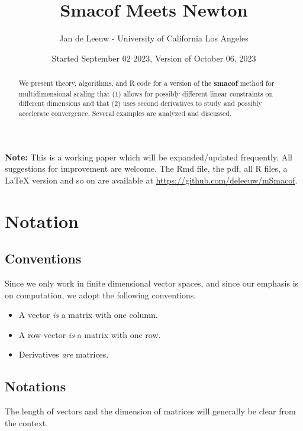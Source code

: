 \documentclass[
  12pt,
]{article}
\title{Smacof Meets Newton}
\author{Jan de Leeuw - University of California Los Angeles}
\date{Started September 02 2023, Version of October 06, 2023}
\providecommand{\tightlist}{%
  \setlength{\itemsep}{0pt}\setlength{\parskip}{0pt}}
\begin{document}
\maketitle
\begin{abstract}
We present theory, algorithms, and R code for a version of the \textbf{smacof} method for multidimensional scaling that (1) allows for possibly different linear constraints on different dimensions and that (2) uses second derivatives to study and possibly accelerate convergence. Several examples are analyzed and discussed.
\end{abstract}

{
\setcounter{tocdepth}{4}
\tableofcontents
}
\textbf{Note:} This is a working paper which will be expanded/updated frequently. All suggestions for improvement are welcome. The Rmd file, the pdf, all R files, a LaTeX version and so on are available at \url{https://github.com/deleeuw/mSmacof}.

\section*{Notation}\label{notation}

\subsection*{Conventions}\label{conventions}

Since we only work in finite dimensional vector spaces, and since our emphasis is on computation, we adopt the following conventions.

\begin{itemize}
\tightlist
\item
  A vector \emph{is} a matrix with one column.
\item
  A row-vector \emph{is} a matrix with one row.
\item
  Derivatives \emph{are} matrices.
\end{itemize}

\subsection*{Notations}\label{notations}

The length of vectors and the dimension of matrices will generally
be clear from the context.
\end{document}
